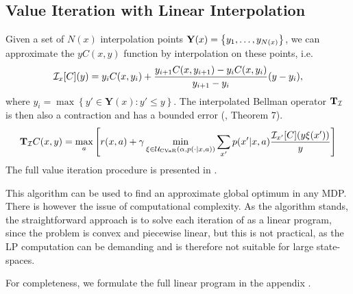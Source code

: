\subsection{Value Iteration with Linear Interpolation}

Given a set of $N(x)$ interpolation points $\mathbf{Y}(x) = \left\{ {y_1, \dots, y_{N(x)}} \right\}$, we can approximate the $yC(x,y)$ function by interpolation on these points, i.e.
%
\begin{equation*}
\mathcal{I}_{x}[C](y)=y_iC(x,y_{i})+\frac{y_{i+1}C(x,y_{i+1})-y_iC(x,y_{i})}{y_{i+1}-y_i}(y-y_i),
\end{equation*}
%
where $y_i = \max \left\{y'\in \mathbf{Y}(x) : y' \leq y\right\}$.
The interpolated Bellman operator $\mathbf{T}_{\mathcal{I}}$ is then also a contraction and has a bounded error (\citep{chow2015risk}, Theorem 7). 
%
\begin{equation}\label{eqn:linearbellman}
\mathbf{T}_{\mathcal{I}} C(x, y) = \max_a \left[ { r(x, a) + \gamma \min_{\xi \in \mathcal{U}_{\text{CVaR}}(\alpha, p(\cdot | x, a))} \sum_{x'} p(x'| x, a)\dfrac{\mathcal{I}_{x'} [C](y\xi(x'))}{y}} \right]
\end{equation}
%
The full value iteration procedure is presented in . 

This algorithm can be used to find an approximate global optimum in any MDP. There is however the issue of computational complexity. As the algorithm stands, the straightforward approach is to solve each iteration of  as a linear program, since the problem is convex and piecewise linear, but this is not practical, as the LP computation can be demanding and is therefore not suitable for large state-spaces.

For completeness, we formulate the full linear program in the appendix .



